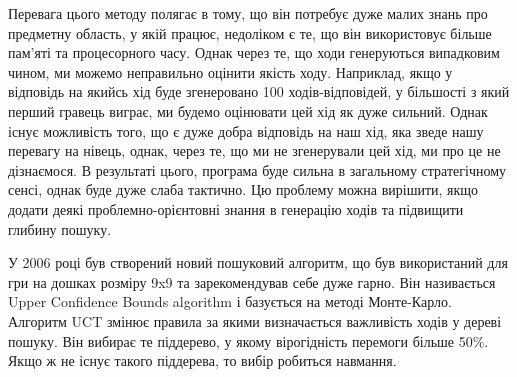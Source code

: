 Перевага цього методу полягає в тому, що він потребує дуже малих знань про предметну область, у якій працює, недоліком є те, що він використовує більше пам'яті та процесорного часу. Однак через те, що ходи генеруються випадковим чином, ми можемо неправильно оцінити якість ходу. Наприклад, якщо у відповідь на якийсь хід буде згенеровано 100 ходів-відповідей, у більшості з який перший гравець виграє, ми будемо оцінювати цей хід як дуже сильний. Однак існує можливість того, що є дуже добра відповідь на наш хід, яка зведе нашу перевагу на нівець, однак, через те, що ми не згенерували цей хід, ми про це не дізнаємося. В результаті цього, програма буде сильна в загальному стратегічному сенсі, однак буде дуже слаба тактично. Цю проблему можна вирішити, якщо додати деякі проблемно-орієнтовні знання в генерацію ходів та підвищити глибину пошуку.

У 2006 році був створений новий пошуковий алгоритм, що був використаний для гри на дошках розміру 9x9 та зарекомендував себе дуже гарно. Він називається Upper Confidence Bounds algorithm і базується на методі Монте-Карло. Алгоритм UCT змінює правила за якими визначається важливість ходів у дереві пошуку. Він вибирає те піддерево, у якому вірогідність перемоги більше 50\%. Якщо ж не існує такого піддерева, то вибір робиться навмання.
